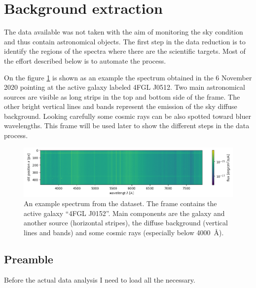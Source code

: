 \section{Background extraction}
The data available was not taken with the aim of monitoring the sky condition and thus contain astronomical objects. The first step in the data reduction is to identify the regions of the spectra where there are the scientific targets. Most of the effort described below is to automate the process.

On the figure \ref{fig:raw_spec} is shown as an example the spectrum obtained in the 6 November 2020 pointing at the active galaxy labeled 4FGL J0512. Two main astronomical sources are visible as long strips in the top and bottom side of the frame. The other bright vertical lines and bands represent the emission of the sky diffuse background. Looking carefully some cosmic rays can be also spotted toward bluer wavelengths. This frame will be used later to show the different steps in the data process.

\begin{figure}[h!]
	\centering
	\includegraphics[width=\textwidth]{./5_mywork/raw_spec}
	\caption{An example spectrum from the dataset. The frame contains the active galaxy ``4FGL J0152''. Main components are the galaxy and another source (horizontal stripes), the diffuse background (vertical lines and bands) and some cosmic rays (especially below \SI{4000}{\angstrom}).\label{fig:raw_spec}}
\end{figure}

\subsection{Preamble}
Before the actual data analysis I need to load all the necessary.

